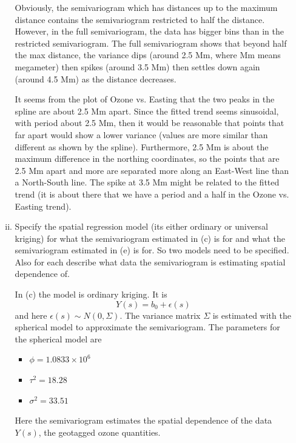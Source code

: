\documentclass[letterpaper, 12pt]{article}\usepackage[]{graphicx}\usepackage[]{color}
\begin{document}
\begin{enumerate}[a.]
\begin{enumerate}[(i)]
{\sf
Obviously, the semivariogram which has distances up to the maximum distance contains the semivariogram restricted to half the distance. However, in the full semivariogram, the data has bigger bins than in the restricted semivariogram. The full semivariogram shows that beyond half the max distance, the variance dips (around 2.5 Mm, where Mm means megameter) then spikes (around 3.5 Mm) then settles down again (around 4.5 Mm) as the distance decreases. 

It seems from the plot of Ozone vs. Easting that the two peaks in the spline are about 2.5 Mm apart. Since the fitted trend seems sinusoidal, with period about 2.5 Mm, then it would be reasonable that points that far apart would show a lower variance (values are more similar than different as shown by the spline). Furthermore, 2.5 Mm is about the maximum difference  in the northing coordinates, so the points that are 2.5 Mm apart and more are separated more along an East-West line than a North-South line. The spike at 3.5 Mm might be related to the fitted trend (it is about there that we have a period and a half in the Ozone vs. Easting trend).  
}
\item
Specify the spatial regression model (its either ordinary or universal kriging) for what the semivariogram estimated in (c) is for and what the semivariogram estimated in (e) is for. 
So two models need to be specified. 
Also for each describe what data the semivariogram is estimating spatial dependence of.

{\sf
In (c) the model is ordinary kriging. It is 
\[
Y(s) = b_0 + \epsilon(s)
\]
and here $\epsilon(s) \sim N(0, \Sigma)$. The variance matrix $\Sigma$ is estimated with the spherical model to approximate the semivariogram. The parameters for the spherical model are
\begin{itemize}
\item
$\phi = \ensuremath{1.0833\times 10^{6}}$
\item
$\tau^2 = 18.28$
\item
$\sigma^2 = 33.51$
\end{itemize}
Here the semivariogram estimates the spatial dependence of the data $Y(s)$, the geotagged ozone quantities. 

}
\end{enumerate}
\end{enumerate}
\end{document}
